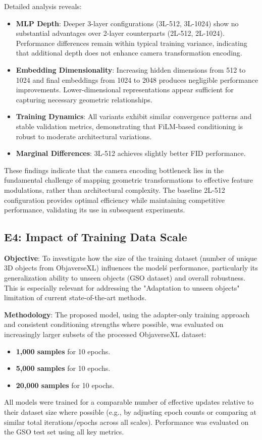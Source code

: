 Detailed analysis reveals:
\begin{itemize}
  \item \textbf{MLP Depth}: Deeper 3-layer configurations (3L-512, 3L-1024) show no substantial advantages over 2-layer counterparts (2L-512, 2L-1024). Performance differences remain within typical training variance, indicating that additional depth does not enhance camera transformation encoding.
  \item \textbf{Embedding Dimensionality}: Increasing hidden dimensions from 512 to 1024 and final embeddings from 1024 to 2048 produces negligible performance improvements. Lower-dimensional representations appear sufficient for capturing necessary geometric relationships.
  \item \textbf{Training Dynamics}: All variants exhibit similar convergence patterns and stable validation metrics, demonstrating that FiLM-based conditioning is robust to moderate architectural variations.
  \item \textbf{Marginal Differences}: 3L-512 achieves slightly better FID performance.
\end{itemize}

These findings indicate that the camera encoding bottleneck lies in the fundamental challenge of mapping geometric transformations to effective feature modulations, rather than architectural complexity. The baseline 2L-512 configuration provides optimal efficiency while maintaining competitive performance, validating its use in subsequent experiments.

\subsection{E4: Impact of Training Data Scale}\label{ssec:exp_data_scale}
\textbf{Objective}: To investigate how the size of the training dataset (number of unique 3D objects from ObjaverseXL) influences the model\'s performance, particularly its generalization ability to unseen objects (GSO dataset) and overall robustness. This is especially relevant for addressing the "Adaptation to unseen objects" limitation of current state-of-the-art methods.

\textbf{Methodology}:
The proposed model, using the adapter-only training approach and consistent conditioning strengths where possible, was evaluated on increasingly larger subsets of the processed ObjaverseXL dataset:
\begin{itemize}
  \item \textbf{1,000 samples} for 10 epochs.
  \item \textbf{5,000 samples} for 10 epochs.
  \item \textbf{20,000 samples} for 10 epochs.
\end{itemize}
All models were trained for a comparable number of effective updates relative to their dataset size where possible (e.g., by adjusting epoch counts or comparing at similar total iterations/epochs across all scales). Performance was evaluated on the GSO test set using all key metrics.

